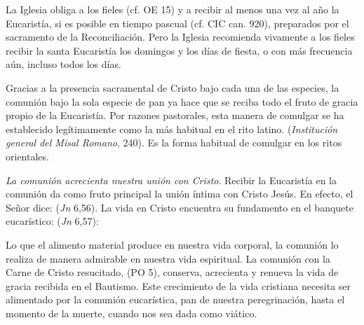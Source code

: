 \begin{ccebody}
 La Iglesia obliga a los fieles  (cf. OE 15) y a recibir al menos una vez al año la Eucaristía, si es posible en tiempo pascual (cf. CIC can. 920), preparados por el sacramento de la Reconciliación. Pero la Iglesia recomienda vivamente a los fieles recibir la santa Eucaristía los domingos y los días de fiesta, o con más frecuencia aún, incluso todos los días.

 Gracias a la presencia sacramental de Cristo bajo cada una de las especies, la comunión bajo la sola especie de pan ya hace que se reciba todo el fruto de gracia propio de la Eucaristía. Por razones pastorales, esta manera de comulgar se ha establecido legítimamente como la más habitual en el rito latino.  (\textit{Institución general del Misal Romano}, 240). Es la forma habitual de comulgar en los ritos orientales.

 \textit{La comunión acrecienta nuestra unión con Cristo}. Recibir la Eucaristía en la comunión da como fruto principal la unión íntima con Cristo Jesús. En efecto, el Señor dice:  (\textit{Jn} 6,56). La vida en Cristo encuentra su fundamento en el banquete eucarístico:  (\textit{Jn} 6,57):


 Lo que el alimento material produce en nuestra vida corporal, la comunión lo realiza de manera admirable en nuestra vida espiritual. La comunión con la Carne de Cristo resucitado,  (PO 5), conserva, acrecienta y renueva la vida de gracia recibida en el Bautismo. Este crecimiento de la vida cristiana necesita ser alimentado por la comunión eucarística, pan de nuestra peregrinación, hasta el momento de la muerte, cuando nos sea dada como viático.


\end{ccebody}
